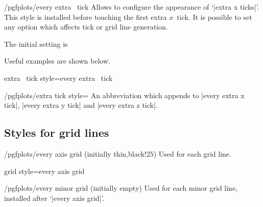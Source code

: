 \begin{xystylekey}{/pgfplots/every extra \x\ tick}
    Allows to configure the appearance of `|extra x ticks|'. This style is
    installed before touching the first extra $x$~tick. It is possible to set
    any option which affects tick or grid line generation.

    The initial setting is
\begin{codeexample}
\end{codeexample}

    Useful examples are shown below.
\begin{codeexample}
\end{codeexample}
\end{xystylekey}

\pgfplotsshortxystylekey extra \x\ tick style=every extra \x\ tick\pgfeov

\begin{stylekey}{/pgfplots/extra tick style=}
    An abbreviation which appends  to
    |every extra x tick|, |every extra y tick| and |every extra z tick|.
\end{stylekey}


\subsection*{Styles for grid lines}

\begin{stylekey}{/pgfplots/every axis grid (initially thin,black!25)}
    Used for each grid line.
\end{stylekey}

\pgfplotsshortstylekey grid style=every axis grid\pgfeov

\begin{stylekey}{/pgfplots/every minor grid (initially empty)}
    Used for each minor grid line, installed after `|every axis grid|'.
\end{stylekey}

